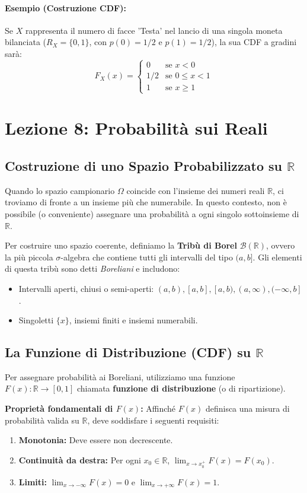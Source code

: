 \documentclass[12pt, a4paper]{article}
\begin{document}
\paragraph{Esempio (Costruzione CDF):} 
Se $X$ rappresenta il numero di facce 'Testa' nel lancio di una singola moneta bilanciata ($R_X = \{0, 1\}$, con $p(0)=1/2$ e $p(1)=1/2$), la sua CDF a gradini sarà:
$$
F_X(x) = 
\begin{cases} 
0 & \text{se } x < 0 \\
1/2 & \text{se } 0 \le x < 1 \\
1 & \text{se } x \ge 1
\end{cases}
$$


\section{Lezione 8: Probabilità sui Reali}

\subsection{Costruzione di uno Spazio Probabilizzato su $\mathbb{R}$}
Quando lo spazio campionario $\Omega$ coincide con l'insieme dei numeri reali $\mathbb{R}$, ci troviamo di fronte a un insieme più che numerabile. In questo contesto, non è possibile (o conveniente) assegnare una probabilità a ogni singolo sottoinsieme di $\mathbb{R}$. 

Per costruire uno spazio coerente, definiamo la \textbf{Tribù di Borel} $\mathcal{B}(\mathbb{R})$, ovvero la più piccola $\sigma$-algebra che contiene tutti gli intervalli del tipo $(a, b]$. Gli elementi di questa tribù sono detti \textit{Boreliani} e includono:
\begin{itemize}
    \item Intervalli aperti, chiusi o semi-aperti: $(a,b), [a,b], [a,b), (a,\infty), (-\infty, b]$.
    \item Singoletti $\{x\}$, insiemi finiti e insiemi numerabili.
\end{itemize}

\subsection{La Funzione di Distribuzione (CDF) su $\mathbb{R}$}
Per assegnare probabilità ai Boreliani, utilizziamo una funzione $F(x): \mathbb{R} \to [0, 1]$ chiamata \textbf{funzione di distribuzione} (o di ripartizione). 

\textbf{Proprietà fondamentali di $F(x)$:}
Affinché $F(x)$ definisca una misura di probabilità valida su $\mathbb{R}$, deve soddisfare i seguenti requisiti:
\begin{enumerate}
    \item \textbf{Monotonia:} Deve essere non decrescente.
    \item \textbf{Continuità da destra:} Per ogni $x_0 \in \mathbb{R}$, $\lim_{x \to x_0^+} F(x) = F(x_0)$.
    \item \textbf{Limiti:} $\lim_{x \to -\infty} F(x) = 0$ e $\lim_{x \to +\infty} F(x) = 1$.
\end{enumerate}
\end{document}

